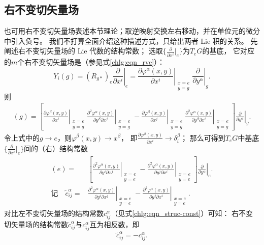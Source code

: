 \subsection{右不变切矢量场}
也可用右不变切矢量场表述本节理论；取逆映射交换左右移动，并在单位元的微分中引入负号。
我们不打算全面介绍这种描述方式，只给出两者 Lie 积的关系。
先阐述右不变切矢量场的 Lie 代数的结构常数；
选取$\{\frac{\partial}{\partial x^i}|_{e}\}$为$T_eG$的基底，
它对应的$m$个右不变切矢量场是（参见式\eqref{chlg:eqn_rve}）：
\begin{equation}
    Y_i(g)=(R_{g*})_e \left. \frac{\partial }{\partial x^i }\right|_{e}
    = \left. \frac{\partial \varphi^\alpha (x,y)}{\partial x^i}
    \right|_{\substack{x=e\\y=g}}   \left. \frac{\partial}{\partial y^\alpha}\right|_{g} .
\end{equation}
则
\begin{align*}
    [Y_i, Y_j](g)= \left[ \left. \frac{\partial \varphi^\beta (x,y)}{\partial x^i} \right|_{\substack{x=e\\y=g}}
    \left. \frac{\partial^2 \varphi^\alpha (x,y)}{\partial y^\beta \partial x^j} \right|_{\substack{x=e\\y=g}}
    - \left. \frac{\partial \varphi^\beta (x,y)}{\partial x^j} \right|_{\substack{x=e\\y=g}}
    \left. \frac{\partial^2 \varphi^\alpha (x,y)}{\partial y^\beta \partial x^i} \right|_{\substack{x=e\\y=g}}
    \right] \left. \frac{\partial}{\partial y^\alpha}\right|_{g} .
\end{align*}
令上式中的$g\to e$，则$\varphi^\beta(x,y) \to x^\beta$，
即$\frac{\partial \varphi^\beta (x,y)}{\partial x^i}\to \delta^\beta_i$；
那么可得到$T_eG$中基底$\{\frac{\partial}{\partial x^i}|_{e}\}$间的（右）结构常数
\begin{align}
    [Y_i, Y_j](e)=& \left[ \left. \frac{\partial^2 \varphi^\alpha (x,y)}{\partial y^i \partial x^j} \right|_{\substack{x=e\\y=e}}
    -\left. \frac{\partial^2 \varphi^\alpha (x,y)}{\partial y^j \partial x^i} \right|_{\substack{x=e\\y=e}}
    \right] \left. \frac{\partial}{\partial y^\alpha}\right|_{e} . \\
    \text{记}\quad
    \tilde{c}^\alpha_{ij}=&\left. \frac{\partial^2 \varphi^\alpha (x,y)}{\partial y^i \partial x^j} \right|_{\substack{x=e\\y=e}} -\left.
    \frac{\partial^2 \varphi^\alpha (x,y)}{\partial y^j \partial x^i} \right|_{\substack{x=e\\y=e}} . 
\end{align}
对比左不变切矢量场的结构常数$c^\alpha_{ij}$（见式\eqref{chlg:eqn_struc-const}）可知：
右不变切矢量场的结构常数$\tilde{c}^\alpha_{ij}$与$c^\alpha_{ij}$互为相反数，即
\begin{equation}\label{chlg:eqn_SC-lr}
    \tilde{c}^\alpha_{ij} = -c^\alpha_{ij} .
\end{equation}

